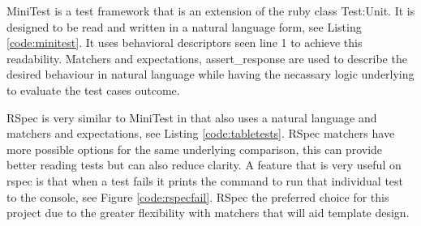 \documentclass[a4paper,12pt]{article}
\begin{document}
\vspace{3mm}
\par MiniTest is a test framework that is an extension of the ruby class Test:Unit. It is designed to be read and written in a natural language form, see Listing \ref{code:minitest}. It uses behavioral descriptors seen line 1 to achieve this readability. Matchers and expectations, assert\_response are used to describe the desired behaviour in natural language while having the necassary logic underlying to evaluate the test cases outcome.
\vspace{3mm}
\par RSpec is very similar to MiniTest in that also uses a natural language and matchers and expectations, see Listing \ref{code:tabletests}. RSpec matchers have more possible options for the same underlying comparison, this can provide better reading tests but can also reduce clarity. A feature that is very useful on rspec is that when a test fails it prints the command to run that individual test to the console, see Figure \ref{code:rspecfail}. RSpec the preferred choice for this project due to the greater flexibility with matchers that will aid template design.
\end{document}
